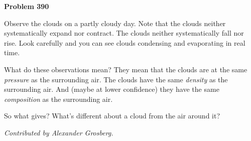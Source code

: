 \documentclass[12pt]{article}
\begin{document}
\begin{pottproblem}
\textbf{Problem 390}

Observe the clouds on a partly cloudy day.
Note that the clouds neither systematically expand nor contract.
The clouds neither systematically fall nor rise.
Look carefully and you can see clouds condensing and evaporating in real time.

What do these observations mean?
They mean that the clouds are at the same \emph{pressure} as the surrounding air.
The clouds have the same \emph{density} as the surrounding air.
And (maybe at lower confidence) they have the same \emph{composition} as the surrounding air.

So what gives? What's different about a cloud from the air around it?

{\normalsize\emph{Contributed by Alexander Grosberg.}}
\end{pottproblem}
\end{document}
